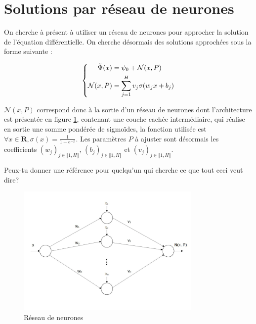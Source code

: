 \documentclass[12pt]{report}
\begin{document}
\section{Solutions par réseau de neurones}

On cherche à présent à utiliser un réseau de neurones pour approcher la solution de l'équation différentielle. On cherche désormais des solutions approchées sous la forme suivante :

\begin{equation}
\left\{
    \begin{aligned}
        \Tilde{\Psi}(x) &= \psi_0 + {\mathcal{N}}(x,P) \\
        {\mathcal{N}}(x,P) &= \sum_{j=1}^{H} v_j \sigma(w_jx+b_j)
    \end{aligned}
\right.
\label{eq:solution NN}
\end{equation}

${\mathcal{N}}(x,P)$ correspond donc à la sortie d'un réseau de neurones dont l'architecture est présentée en figure \ref{fig:NN}, contenant une couche cachée intermédiaire, qui réalise en sortie une somme pondérée de sigmoïdes, la fonction utilisée est ${\displaystyle{\forall x \in \mathbf{R}, \sigma(x) = \frac{1}{1+e^{-x}}}}$. Les paramètres $P$ à ajuster sont désormais les coefficients $(w_j)_{j\in \llbracket 1,H \rrbracket}$, $(b_j)_{j\in \llbracket 1,H \rrbracket}$ et $(v_j)_{j\in \llbracket 1,H \rrbracket}$.

{\color{red}Peux-tu donner une référence pour quelqu'un qui cherche ce que tout ceci veut dire?}
\begin{figure}
\centering
\includegraphics[width=0.8\textwidth]{NN.jpg}
\caption{\label{fig:NN}Réseau de neurones}
\end{figure}
\end{document}
